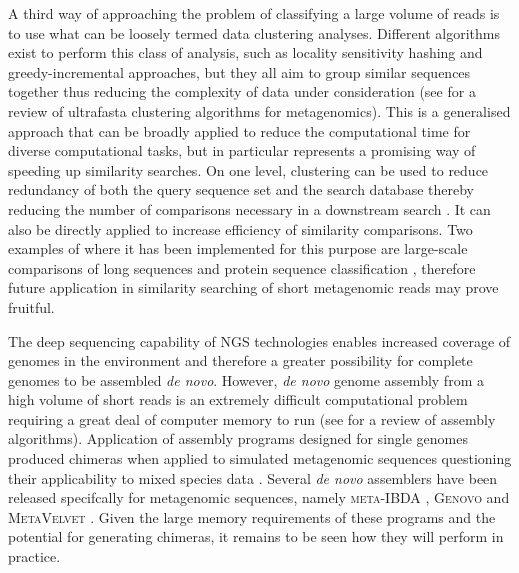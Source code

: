 A third way of approaching the problem of classifying a large volume of reads is to use what can be loosely termed data clustering analyses.
Different algorithms exist to perform this class of analysis, such as locality sensitivity hashing and greedy-incremental approaches, but they all aim to group similar sequences together thus reducing the complexity of data under consideration (see \citet{Li2012} for a review of ultrafasta clustering algorithms for metagenomics).
This is a generalised approach that can be broadly applied to reduce the computational time for diverse computational tasks, but in particular represents a promising way of speeding up similarity searches.
On one level, clustering can be used to reduce redundancy of both the query sequence set and the search database thereby reducing the number of comparisons necessary in a downstream search \cite{Li2012}.
It can also be directly applied to increase efficiency of similarity comparisons.
Two examples of where it has been implemented for this purpose are large-scale comparisons of long sequences \cite{Buhler2001} and protein sequence classification \cite{Caragea2012}, therefore future application in similarity searching of short metagenomic reads may prove fruitful.

The deep sequencing capability of \ac{NGS} technologies enables increased coverage of genomes in the environment and therefore a greater possibility for complete genomes to be assembled \emph{de novo}.
However, \emph{de novo} genome assembly from a high volume of short reads is an extremely difficult computational problem requiring a great deal of computer memory to run (see \citet{Salzberg2012} for a review of assembly algorithms).
Application of assembly programs designed for single genomes produced chimeras when applied to simulated metagenomic sequences questioning their applicability to mixed species data \cite{Pignatelli2011}.
Several \emph{de novo} assemblers have been released specifcally for metagenomic sequences, namely \textsc{meta-IBDA} \cite{Peng2011}, \textsc{Genovo} \cite{Laserson2011} and \textsc{MetaVelvet} \cite{Namiki2012}.
Given the large memory requirements of these programs and the potential for generating chimeras, it remains to be seen how they will perform in practice.

